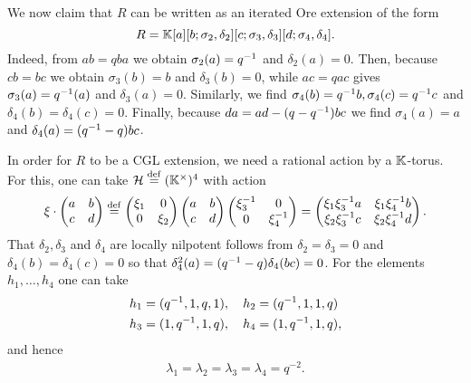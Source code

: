 \begin{example}
	We now claim that $R$ can be written as an iterated Ore extension of the form
	\begin{equation*}
		R = \mathbb{K}[a][b; \sigma_2, \delta_2][c; \sigma_3, \delta_3][d; \sigma_4, \delta_4].
	\end{equation*}
	Indeed, from $ab = qba$ we obtain $\sigma_2(a) = q^{-1}$ and $\delta_2(a) = 0$. Then,
	because $cb = bc$ we obtain $\sigma_3(b) = b$ and $\delta_3(b) = 0$, while $ac = qac$
	gives $\sigma_3(a) = q^{-1}(a)$ and $\delta_3(a) = 0$. Similarly, we find $\sigma_4(b) =
		q^{-1} b, \sigma_4(c) = q^{-1} c$ and $\delta_4(b) = \delta_4(c) = 0$. Finally, because
	$da = ad - (q - q^{-1})bc$ we find $\sigma_4(a) = a$ and $\delta_4(a) = (q^{-1} - q)bc$.

	In order for $R$ to be a CGL extension, we need a rational action by a $\mathbb{K}$-torus.
	For this, one can take $\mathcal{H} \overset{\mathrm{def}}{=} (\mathbb{K}^\times)^4$ with action
	\begin{equation*}
		\xi \cdot \begin{pmatrix}
			a & b \\
			c & d
		\end{pmatrix}
		\overset{\mathrm{def}}{=} \begin{pmatrix}
			\xi_1 & 0     \\
			0     & \xi_2
		\end{pmatrix}
		\begin{pmatrix}
			a & b \\
			c & d
		\end{pmatrix}
		\begin{pmatrix}
			\xi_3^{-1} & 0         \\
			0         & \xi_4^{-1}
		\end{pmatrix}
		= \begin{pmatrix}
			\xi_1\xi_3^{-1} a & \xi_1\xi_4^{-1} b \\
			\xi_2\xi_3^{-1} c & \xi_2\xi_4^{-1} d
		\end{pmatrix}.
	\end{equation*}
	That $\delta_2, \delta_3$ and $\delta_4$ are locally nilpotent follows from $\delta_2 =
		\delta_3 = 0$ and $\delta_4(b) = \delta_4(c) = 0$ so that $\delta_4^2(a) = (q^{-1} -
		q)\delta_4(bc) = 0$. For the elements $h_1, \dots, h_4$ one can take
	\begin{align*}
		 & h_1 = (q^{-1}, 1, q, 1),\quad h_2 = (q^{-1}, 1,1,q) \\
		 & h_3 = (1,q^{-1},1,q),\quad h_4 =(1,q^{-1}, 1, q),
	\end{align*}
	and hence
	\begin{align*}
		\lambda_1 = \lambda_2 = \lambda_3 = \lambda_4 = q^{-2}.
	\end{align*}
\end{example}

